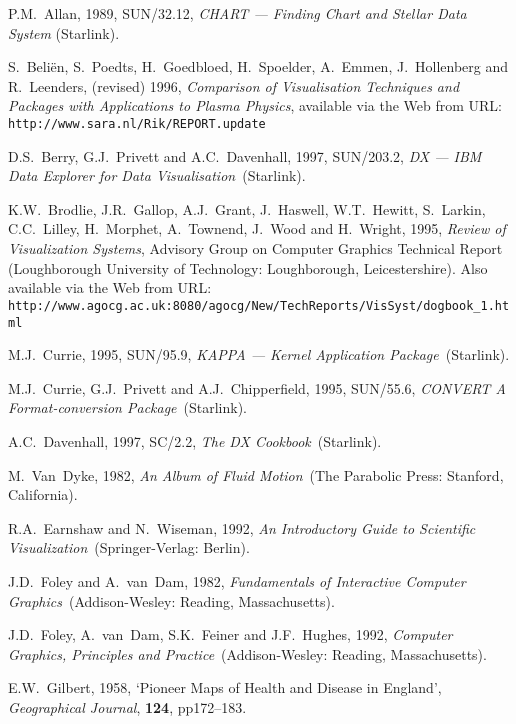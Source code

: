 \documentclass[twoside,11pt]{article}
\begin{document}
\begin{thebibliography}{99}

   P.M.~Allan, 1989, SUN/32.12, {\it CHART --- Finding
   Chart and Stellar Data System} (Starlink).

   S.~Beli\"{e}n, S.~Poedts, H.~Goedbloed, H.~Spoelder,
   A.~Emmen, J.~Hollenberg and R.~Leenders, (revised) 1996,
   {\it Comparison of Visualisation Techniques and Packages with
   Applications to Plasma Physics}, available via the Web from URL:
   {\tt http://www.sara.nl/Rik/REPORT.update}

   D.S.~Berry, G.J.~Privett and A.C.~Davenhall, 1997,
   SUN/203.2, {\it DX --- IBM Data Explorer for Data Visualisation}\,
   (Starlink).

   K.W.~Brodlie, J.R.~Gallop, A.J.~Grant, J.~Haswell,
   W.T.~Hewitt, S.~Larkin, C.C.~Lilley, H.~Morphet, A.~Townend,
   J.~Wood and H.~Wright, 1995, {\it Review of Visualization Systems},
   Advisory Group on Computer Graphics Technical Report (Loughborough
   University of Technology: Loughborough, Leicestershire). Also
   available via the Web from URL: {\tt
   http://www.agocg.ac.uk:8080/agocg/New/TechReports/VisSyst/dogbook\_1.html}

   M.J.~Currie, 1995, SUN/95.9, {\it KAPPA --- Kernel
   Application Package}\, (Starlink).

   M.J.~Currie, G.J.~Privett and A.J.~Chipperfield,
   1995, SUN/55.6, {\it CONVERT A Format-conversion Package}\, (Starlink).

   A.C.~Davenhall, 1997, SC/2.2, {\it The DX Cookbook}\,
   (Starlink).

   M.~Van~Dyke, 1982, {\it An Album of Fluid Motion}\,
   (The Parabolic Press: Stanford, California).

   R.A.~Earnshaw and N.~Wiseman, 1992, {\it An
   Introductory Guide to Scientific Visualization}\,
   (Springer-Verlag: Berlin).

   J.D.~Foley and A.~van~Dam, 1982, {\it Fundamentals
   of Interactive Computer Graphics}\, (Addison-Wesley: Reading,
   Massachusetts).

   J.D.~Foley, A.~van~Dam, S.K.~Feiner and J.F.~Hughes,
   1992, {\it Computer Graphics, Principles and Practice}\,
   (Addison-Wesley: Reading, Massachusetts).

   E.W.~Gilbert, 1958, `Pioneer Maps of Health and
   Disease in England', {\it Geographical Journal}, {\bf 124},
   pp172--183.


\end{thebibliography}
\end{document}
